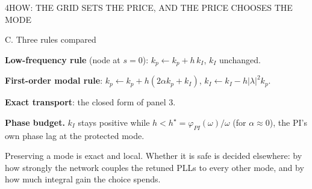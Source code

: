 {\begin{minipage}[t][\PosterFourHeight][t]{\PosterGridWidth}
\begin{PosterPanel}{\PosterFourHeight}{4}{HOW: THE GRID SETS THE PRICE, AND THE PRICE CHOOSES THE MODE}
\begin{minipage}[t]{262mm}
    \end{minipage}\hfill%
    \begin{minipage}[t]{262mm}\vspace{0pt}
      {\Subhead\color{IASDarkGreen}C. Three rules compared\par}\vspace{1mm}
      {\FigureSize \textbf{Low-frequency rule} (node at $s=0$): $k_p\!\leftarrow\!k_p+h\,k_I$, $k_I$ unchanged.\par}\vspace{1.5mm}
      {\FigureSize \textbf{First-order modal rule}: $k_p\!\leftarrow\!k_p+h(2\alpha k_p+k_I)$, $k_I\!\leftarrow\!k_I-h|\lambda|^{2}k_p$.\par}\vspace{1.5mm}
      {\FigureSize \textbf{Exact transport}: the closed form of panel 3.\par}
      \vspace{2mm}
      {\FigureSize \textbf{Phase budget.} $k_I$ stays positive while $h<h^{\star}=\varphi_{PI}(\omega)/\omega$ (for $\alpha\approx0$), the PI's own phase lag at the protected mode.\par}
    \end{minipage}\par
    \vspace{2mm}
    \begin{InWords}\InWordsLabel Preserving a mode is exact and local. Whether it is safe is decided elsewhere: by how strongly the network couples the retuned PLLs to every other mode, and by how much integral gain the choice spends.\end{InWords}

  \end{PosterPanel}
\end{minipage}%
}%
\ifdefined\PosterFull
  \PosterSectionContent
  \let\PosterSectionFinish\relax
\else
  \def\PosterPageWidth{\PosterPreviewFullPageWidth}
  \def\PosterPageHeight{\PosterPreviewFourPageHeight}
  \def\PosterPreviewLeft{\PosterOuterMargin}
  
  \begin{frame}[t]
  \vspace*{\PosterPreviewTop}
  \noindent\hspace*{\PosterPreviewLeft}%
  \PosterSectionContent
  \end{frame}
  \def\PosterSectionFinish{}
\fi
\PosterSectionFinish
